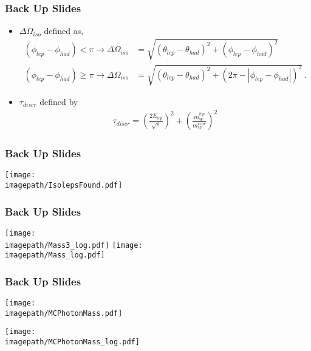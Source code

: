 
\begin{frame}\frametitle{Back Up Slides }

    \begin{itemize}
        \item $\Delta{\Omega}_{iso}$ defined as,
            \begin{align}
                 ({\phi}_{lep} - {\phi}_{had}) < \pi \to \Delta{\Omega}_{iso} &= \sqrt{{({\theta}_{lep} - {\theta}_{had})}^{2}+{({\phi}_{lep} - {\phi}_{had})}^{2}} \\
                 ({\phi}_{lep} - {\phi}_{had}) \ge \pi \to \Delta{\Omega}_{iso} &= \sqrt{{({\theta}_{lep} - {\theta}_{had})}^{2} + {(2\pi - |{\phi}_{lep} - {\phi}_{had} |)}^{2}} \, .
            \end{align}
        \item ${\tau}_{discr}$ defined by
            \begin{align}
                {\tau}_{discr} = {(\frac{2{E}_{lep}}{\sqrt{s}})}^{2} + {(\frac{{m}_{W}^{lep}}{{m}_{W}^{true}})}^{2}
            \end{align}
    \end{itemize}
\end{frame}


\begin{frame}\frametitle{Back Up Slides }

    \texttt{[image: \\imagepath/IsolepsFound.pdf]}

\end{frame}


\begin{frame}\frametitle{Back Up Slides }

    \texttt{[image: \\imagepath/Mass3\_log.pdf]}
    \texttt{[image: \\imagepath/Mass\_log.pdf]}

\end{frame}


\begin{frame}\frametitle{Back Up Slides }

    \begin{minipage}{0.49\textwidth}
        \centering
        \texttt{[image: \\imagepath/MCPhotonMass.pdf]}
    \end{minipage}
    \begin{minipage}{0.49\textwidth}
        \centering
        \texttt{[image: \\imagepath/MCPhotonMass\_log.pdf]}
    \end{minipage}
\end{frame}

